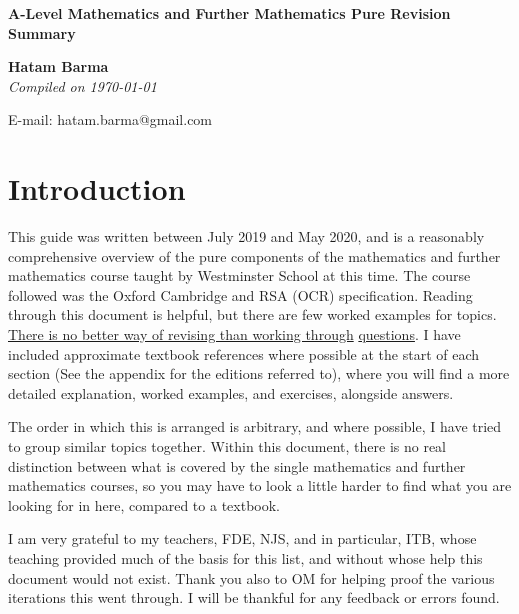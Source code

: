 \documentclass[11pt, a4paper]{article}
\begin{document}
\begin{titlepage}
   \begin{center}
       \vspace*{2.5cm}
	\huge
       \textbf{A-Level Mathematics and Further Mathematics Pure Revision Summary}
            
       \vspace{1.5cm}
	\LARGE
       \textbf{Hatam Barma} \\
	\vspace{0.75cm}
       \normalsize
       \emph{Compiled on \Datea\today} \\

       \vfill
        

	E-mail: hatam.barma@gmail.com
   \end{center}
\end{titlepage}

\section*{Introduction}
This guide was written between July 2019 and May 2020, and is a reasonably comprehensive overview of the pure components of the mathematics and further mathematics course taught by Westminster School at this time. The course followed was the Oxford Cambridge and RSA (OCR) specification. Reading through this document is helpful, but there are few worked examples for topics. \underline{There is no better way of revising than working through} \underline{questions}. I have included approximate textbook references where possible at the start of each section (See the appendix for the editions referred to), where you will find a more detailed explanation, worked examples, and exercises, alongside answers.\newline \par

The order in which this is arranged is arbitrary, and where possible, I have tried to group similar topics together. Within this document, there is no real distinction between what is covered by the single mathematics and further mathematics courses, so you may have to look a little harder to find what you are looking for in here, compared to a textbook. \newline \par

I am very grateful to my teachers, FDE, NJS, and in particular, ITB, whose teaching provided much of the basis for this list, and without whose help this document would not exist. Thank you also to OM for helping proof the various iterations this went through. I will be thankful for any feedback or errors found.
\clearpage
\tableofcontents
\end{document}
